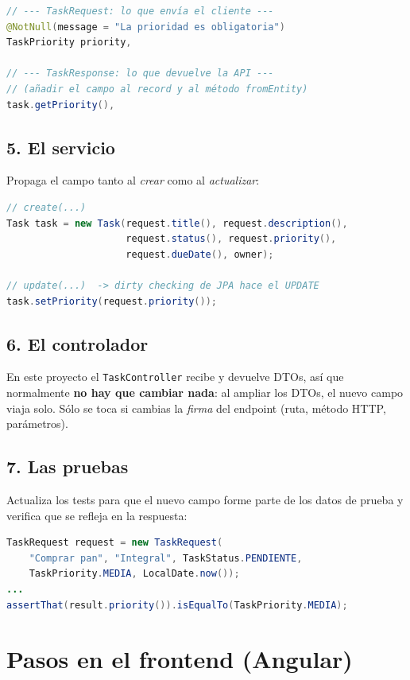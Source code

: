 \documentclass[11pt,a4paper]{article}
\newcommand{\archivo}[1]{\texttt{#1}}
\begin{document}
\begin{lstlisting}[language=Java,caption={TaskRequest.java (entrada) y TaskResponse.java (salida)}]
// --- TaskRequest: lo que envía el cliente ---
@NotNull(message = "La prioridad es obligatoria")
TaskPriority priority,

// --- TaskResponse: lo que devuelve la API ---
// (añadir el campo al record y al método fromEntity)
task.getPriority(),
\end{lstlisting}

\subsection{5. El servicio}
Propaga el campo tanto al \emph{crear} como al \emph{actualizar}:
\begin{lstlisting}[language=Java,caption={TaskService.java}]
// create(...)
Task task = new Task(request.title(), request.description(),
                     request.status(), request.priority(),
                     request.dueDate(), owner);

// update(...)  -> dirty checking de JPA hace el UPDATE
task.setPriority(request.priority());
\end{lstlisting}

\subsection{6. El controlador}
En este proyecto el \archivo{TaskController} recibe y devuelve DTOs, así que
normalmente \textbf{no hay que cambiar nada}: al ampliar los DTOs, el nuevo campo
viaja solo. Sólo se toca si cambias la \emph{firma} del endpoint (ruta, método
HTTP, parámetros).

\subsection{7. Las pruebas}
Actualiza los tests para que el nuevo campo forme parte de los datos de prueba y
verifica que se refleja en la respuesta:
\begin{lstlisting}[language=Java,caption={TaskServiceTest.java}]
TaskRequest request = new TaskRequest(
    "Comprar pan", "Integral", TaskStatus.PENDIENTE,
    TaskPriority.MEDIA, LocalDate.now());
...
assertThat(result.priority()).isEqualTo(TaskPriority.MEDIA);
\end{lstlisting}

\section{Pasos en el frontend (Angular)}
\end{document}
